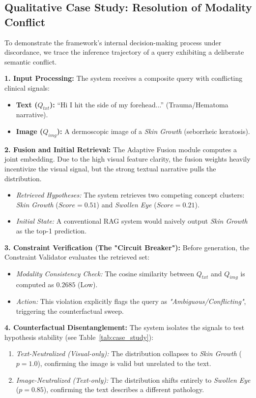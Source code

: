 
\subsection{Qualitative Case Study: Resolution of Modality Conflict}
\label{subsec:case_study}
To demonstrate the framework's internal decision-making process under discordance, we trace the inference trajectory of a query exhibiting a deliberate semantic conflict.

\textbf{1. Input Processing:}
The system receives a composite query with conflicting clinical signals:
\begin{itemize}
    \item \textbf{Text ($Q_{txt}$):} ``Hi I hit the side of my forehead...'' (Trauma/Hematoma narrative).
    \item \textbf{Image ($Q_{img}$):} A dermoscopic image of a \textit{Skin Growth} (seborrheic keratosis).
\end{itemize}

\textbf{2. Fusion and Initial Retrieval:}
The Adaptive Fusion module computes a joint embedding. Due to the high visual feature clarity, the fusion weights heavily incentivize the visual signal, but the strong textual narrative pulls the distribution.
\begin{itemize}
    \item \textit{Retrieved Hypotheses:} The system retrieves two competing concept clusters: \textit{Skin Growth} ($Score=0.51$) and \textit{Swollen Eye} ($Score=0.21$).
    \item \textit{Initial State:} A conventional RAG system would naively output \textit{Skin Growth} as the top-1 prediction.
\end{itemize}

\textbf{3. Constraint Verification (The "Circuit Breaker"):}
Before generation, the Constraint Validator evaluates the retrieved set:
\begin{itemize}
    \item \textit{Modality Consistency Check:} The cosine similarity between $Q_{txt}$ and $Q_{img}$ is computed as $\mathbf{0.2685}$ (Low).
    \item \textit{Action:} This violation explicitly flags the query as \textit{"Ambiguous/Conflicting"}, triggering the counterfactual sweep.
\end{itemize}

\textbf{4. Counterfactual Disentanglement:}
The system isolates the signals to test hypothesis stability (see Table~\ref{tab:case_study}):
\begin{enumerate}
    \item \textit{Text-Neutralized (Visual-only):} The distribution collapses to \textit{Skin Growth} ($p=1.0$), confirming the image is valid but unrelated to the text.
    \item \textit{Image-Neutralized (Text-only):} The distribution shifts entirely to \textit{Swollen Eye} ($p=0.85$), confirming the text describes a different pathology.
\end{enumerate}

